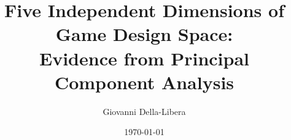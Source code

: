 \documentclass{article}
\title{Five Independent Dimensions of Game Design Space:\\
Evidence from Principal Component Analysis}
\author{Giovanni Della-Libera}
\date{\today}
\begin{document}
\maketitle

\begin{abstract}

\end{abstract}










\end{document}

